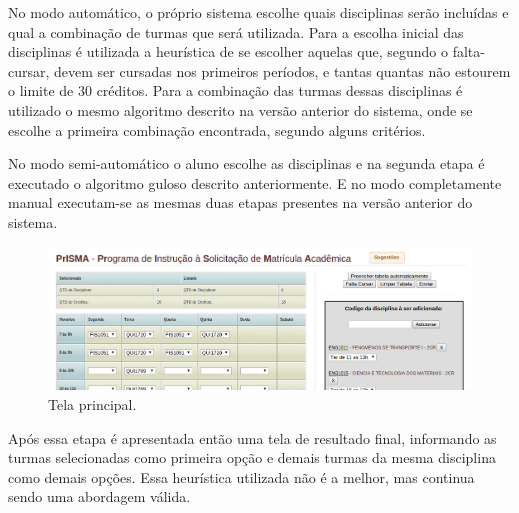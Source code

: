 \documentclass[graduacao,brazil]{ThesisPUC}
\begin{document}
No modo automático, o próprio sistema escolhe quais disciplinas serão incluídas e qual a combinação de turmas que será utilizada. Para a escolha inicial das disciplinas é utilizada a heurística de se escolher aquelas que, segundo o falta-cursar, devem ser cursadas nos primeiros períodos, e tantas quantas não estourem o limite de 30 créditos. Para a combinação das turmas dessas disciplinas é utilizado o mesmo algoritmo descrito na versão anterior do sistema, onde se escolhe a primeira combinação encontrada, segundo alguns critérios.

No modo semi-automático o aluno escolhe as disciplinas e na segunda etapa é executado o algoritmo guloso descrito anteriormente. E no modo completamente manual executam-se as mesmas duas etapas presentes na versão anterior do sistema.

\begin{figure}[H]
    \centering
    \includegraphics[width=\linewidth]{img/v2_horario.png}
    \caption{Tela principal.}
\end{figure}

Após essa etapa é apresentada então uma tela de resultado final, informando as turmas selecionadas como primeira opção e demais turmas da mesma disciplina como demais opções. Essa heurística utilizada não é a melhor, mas continua sendo uma abordagem válida.
\end{document}
